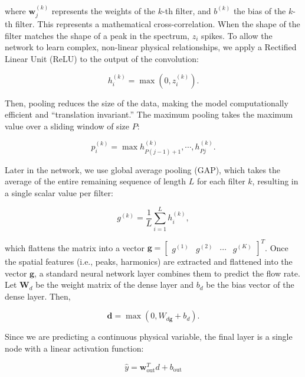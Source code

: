 \documentclass{article}
\begin{document}
where \(\mathbf{w}_j^{(k)}\) represents the weights of the \(k\)-th filter, and
\(b^{(k)}\) the bias of the \(k\)-th filter. This represents a mathematical 
cross-correlation. When the shape of the filter matches the shape of a peak 
in the spectrum, \(z_i\) spikes. To allow the network to learn complex, non-linear physical relationships, 
we apply a Rectified Linear Unit (ReLU) to the output of the convolution: 

\begin{equation}
        h_i^{(k)} = \max{(0, z_i^{(k)})}.
\end{equation}

Then, pooling reduces the size of the data, making the model computationally efficient and ``translation invariant.''
The maximum pooling takes the maximum value over a sliding window of size \(P\): 

\begin{equation}
        p_i^{(k)} = \max{h_{P(j-1)+1}^{(k)}, \cdots, h_{Pj}^{(k)}}.
\end{equation}

Later in the network, we use global average pooling (GAP), which takes the average of the entire remaining sequence 
of length \(L\) for each filter \(k\), resulting in a single scalar value per filter: 

\begin{equation}
        g^{(k)} = \frac{1}{L}\sum_{i=1}^L h_i^{(k)},
\end{equation}

which flattens the matrix into a vector \(\mathbf{g} = \begin{bmatrix} g^{(1)} & g^{(2)} & \cdots & g^{(K)}\end{bmatrix}^T\). 
Once the spatial features (i.e., peaks, harmonics) are extracted and flattened into the vector \(\mathbf{g}\), a standard 
neural network layer combines them to predict the flow rate. Let \(\mathbf{W}_d\) be the weight matrix of the dense layer and 
\(b_d\) be the bias vector of the dense layer. Then, 

\begin{equation}
        \mathbf{d} = \max{(0, W_{d\mathbf{g}}+b_d)}.
\end{equation}

Since we are predicting a continuous physical variable, the final layer is a single node with a linear activation function: 

\begin{equation}
        \hat{y} = \mathbf{w}_{\text{out}}^T d + b_{\text{out}}
\end{equation}
\end{document}

